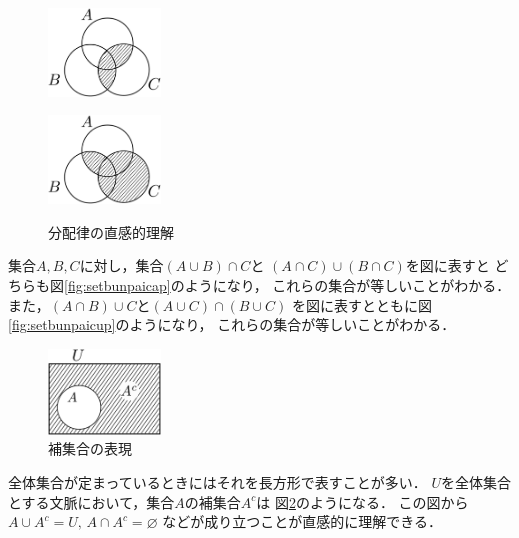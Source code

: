    \begin{figure}[h]
     \begin{minipage}{0.45\linewidth}
       \centering
       \includegraphics[width=3cm]{inputyou/set/picture/setbunpaicap.pdf}
       \label{fig:setbunpaicap}
     \end{minipage}
     \begin{minipage}{0.45\linewidth}
       \centering
       \includegraphics[width=3cm]{inputyou/set/picture/setbunpaicup.pdf}
       \label{fig:setbunpaicup}
     \end{minipage}
     \caption{分配律の直感的理解}
     \label{fig:setbunpairitu}
   \end{figure}

   集合$A,  B,  C$に対し，集合$(A \cup B) \cap C$と
   $(A \cap C) \cup (B \cap C)$を図に表すと
   どちらも図\ref{fig:setbunpaicap}のようになり，
   これらの集合が等しいことがわかる．
   また，$(A \cap B) \cup C$と$(A \cup C) \cap (B \cup C)$
   を図に表すとともに図\ref{fig:setbunpaicup}のようになり，
   これらの集合が等しいことがわかる．

   \begin{figure}
     \centering
     \includegraphics[width=3cm]{inputyou/set/picture/setcomplement.pdf}
     \caption{補集合の表現}
     \label{fig:setcomplement}
   \end{figure}
   
   全体集合が定まっているときにはそれを長方形で表すことが多い．
   $U$を全体集合とする文脈において，集合$A$の補集合$A^c$は
   図\ref{fig:setcomplement}のようになる．
   この図から$A \cup A^c = U , \,  A \cap A^c = \varnothing$
   などが成り立つことが直感的に理解できる．

